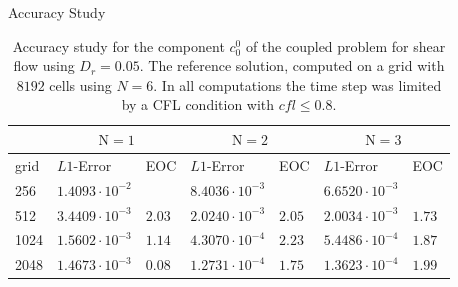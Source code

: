 
\begin{frame}{Accuracy Study}
	\scriptsize
	\begin{table}[H]
		\centering
		\begin{tabular}{|l|l|l|l|l|l|l|}
			\hline 
			& \multicolumn{2}{|c|}{$\mathrm{N}=1$} & \multicolumn{2}{|c|}{$\mathrm{N}=2$} & \multicolumn{2}{|c|}{$\mathrm{N}=3$}  \\
			\hline 
			grid & $L1$-Error & EOC  & $L1$-Error & EOC  & $L1$-Error & EOC\\
			\hline
			256  & $ 1.4093 \cdot 10^{-2}$ & & $ 8.4036 \cdot 10^{-3}$&&$6.6520  \cdot 10^{-3}$& \\
			\hline
			512 & $3.4409 \cdot 10^{-3}$ & $2.03$& $ 2.0240  \cdot 10^{-3}$&$2.05$& $ 2.0034 \cdot 10^{-3}$&$1.73$ \\
			\hline 
			1024  &$ 1.5602\cdot 10^{-3}$&$1.14$& $ 4.3070 \cdot 10^{-4}$&$2.23$ & $5.4486\cdot 10^{-4}$&$1.87$\\
			\hline
			2048 & $1.4673\cdot 10^{-3}$ &$0.08$& $ 1.2731 \cdot 10^{-4}$&$1.75$& $ 1.3623 \cdot 10^{-4}$&$1.99$\\
			\hline
		\end{tabular}
		\caption{Accuracy study for the component $c^0_0$ of the coupled problem for shear flow using $D_r=0.05$. The reference solution, computed on a grid with $8192$ cells using $N=6$. In all computations the time step was limited by a CFL condition with $cfl \leq 0.8$.}
		\label{tab:Dr=0.05_error_N=1,2,3vsN=6}
	\end{table}
\end{frame}



